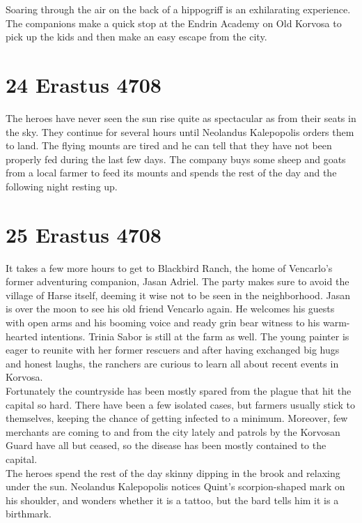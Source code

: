 Soaring through the air on the back of a hippogriff is an exhilarating experience. The companions make a quick stop at the Endrin Academy on Old Korvosa to pick up the kids and then make an easy escape from the city.\\

\section{24 Erastus 4708}

The heroes have never seen the sun rise quite as spectacular as from their seats in the sky. They continue for several hours until Neolandus Kalepopolis orders them to land. The flying mounts are tired and he can tell that they have not been properly fed during the last few days. The company buys some sheep and goats from a local farmer to feed its mounts and spends the rest of the day and the following night resting up.\\

\section{25 Erastus 4708}

It takes a few more hours to get to Blackbird Ranch, the home of Vencarlo's former adventuring companion, Jasan Adriel. The party makes sure to avoid the village of Harse itself, deeming it wise not to be seen in the neighborhood. Jasan is over the moon to see his old friend Vencarlo again. He welcomes his guests with open arms and his booming voice and ready grin bear witness to his warm-hearted intentions. Trinia Sabor is still at the farm as well. The young painter is eager to reunite with her former rescuers and after having exchanged big hugs and honest laughs, the ranchers are curious to learn all about recent events in Korvosa.\\

Fortunately the countryside has been mostly spared from the plague that hit the capital so hard. There have been a few isolated cases, but farmers usually stick to themselves, keeping the chance of getting infected to a minimum. Moreover, few merchants are coming to and from the city lately and patrols by the Korvosan Guard have all but ceased, so the disease has been mostly contained to the capital.\\

The heroes spend the rest of the day skinny dipping in the brook and relaxing under the sun. Neolandus Kalepopolis notices Quint's scorpion-shaped mark on his shoulder, and wonders whether it is a tattoo, but the bard tells him it is a birthmark.\\

